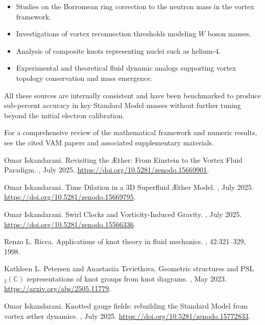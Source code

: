 \documentclass[11pt]{article}
\begin{document}
    \begin{itemize}
        \item Studies on the Borromean ring correction to the neutron mass in the vortex framework.
        \item Investigations of vortex reconnection thresholds modeling $W$ boson masses.
        \item Analysis of composite knots representing nuclei such as helium-4.
        \item Experimental and theoretical fluid dynamic analogs supporting vortex topology conservation and mass emergence.
    \end{itemize}

    All these sources are internally consistent and have been benchmarked to produce sub-percent accuracy in key Standard Model masses without further tuning beyond the initial electron calibration.

    \vspace{1em}
    For a comprehensive review of the mathematical framework and numeric results, see the cited VAM papers and associated supplementary materials.

    
    \begin{thebibliography}{10}

        Omar Iskandarani.
        \newblock Revisiting the Æther: From Einstein to the Vortex Fluid Paradigm.
        , July 2025.
        \newblock \url{https://doi.org/10.5281/zenodo.15669901}.

        Omar Iskandarani.
        \newblock Time Dilation in a 3D Superfluid Æther Model.
        , July 2025.
        \newblock \url{https://doi.org/10.5281/zenodo.15669795}.

        Omar Iskandarani.
        \newblock Swirl Clocks and Vorticity-Induced Gravity.
        , July 2025.
        \newblock \url{https://doi.org/10.5281/zenodo.15566336}.

        Renzo L. Ricca.
        \newblock Applications of knot theory in fluid mechanics.
        , 42:321–329, 1998.

        Kathleen L. Petersen and Anastasiia Tsvietkova.
        \newblock Geometric structures and PSL$_2(\mathbb{C})$ representations of knot groups from knot diagrams.
        , May 2023.
        \newblock \url{https://arxiv.org/abs/2505.11779}.

        Omar Iskandarani.
        \newblock Knotted gauge fields: rebuilding the Standard Model from vortex æther dynamics.
        , July 2025.
        \newblock \url{https://doi.org/10.5281/zenodo.15772833}.

    \end{thebibliography}

    
    \vspace{1em}
\end{document}
